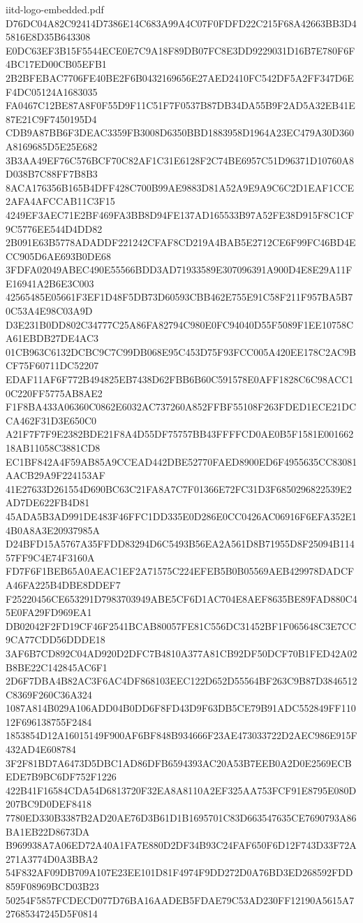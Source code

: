 \begin{filecontents*}[overwrite]{iitd-logo-embedded.pdf}
D76DC04A82C92414D7386E14C683A99A4C07F0FDFD22C215F68A42663BB3D45816E8D35B643308
E0DC63EF3B15F5544ECE0E7C9A18F89DB07FC8E3DD9229031D16B7E780F6F4BC17ED00CB05EFB1
2B2BFEBAC7706FE40BE2F6B0432169656E27AED2410FC542DF5A2FF347D6EF4DC05124A1683035
FA0467C12BE87A8F0F55D9F11C51F7F0537B87DB34DA55B9F2AD5A32EB41E87E21C9F7450195D4
CDB9A87BB6F3DEAC3359FB3008D6350BBD1883958D1964A23EC479A30D360A8169685D5E25E682
3B3AA49EF76C576BCF70C82AF1C31E6128F2C74BE6957C51D96371D10760A8D038B7C88FF7B8B3
8ACA176356B165B4DFF428C700B99AE9883D81A52A9E9A9C6C2D1EAF1CCE2AFA4AFCCAB11C3F15
4249EF3AEC71E2BF469FA3BB8D94FE137AD165533B97A52FE38D915F8C1CF9C5776EE544D4DD82
2B091E63B5778ADADDF221242CFAF8CD219A4BAB5E2712CE6F99FC46BD4ECC905D6AE693B0DE68
3FDFA02049ABEC490E55566BDD3AD71933589E307096391A900D4E8E29A11FE16941A2B6E3C003
42565485E05661F3EF1D48F5DB73D60593CBB462E755E91C58F211F957BA5B70C53A4E98C03A9D
D3E231B0DD802C34777C25A86FA82794C980E0FC94040D55F5089F1EE10758CA61EBDB27DE4AC3
01CB963C6132DCBC9C7C99DB068E95C453D75F93FCC005A420EE178C2AC9BCF75F60711DC52207
EDAF11AF6F772B494825EB7438D62FBB6B60C591578E0AFF1828C6C98ACC10C220FF5775AB8AE2
F1F8BA433A06360C0862E6032AC737260A852FFBF55108F263FDED1ECE21DCCA462F31D3E650C0
A21F7F7F9E2382BDE21F8A4D55DF75757BB43FFFFCD0AE0B5F1581E00166218AB11058C3881CD8
EC1BF842A4F59AB85A9CCEAD442DBE52770FAED8900ED6F4955635CC83081AACB29A9F224153AF
41E27633D261554D690BC63C21FA8A7C7F01366E72FC31D3F6850296822539E2AD7DE622FB4D81
45ADA5B3AD991DE483F46FFC1DD335E0D286E0CC0426AC06916F6EFA352E14B0A8A3E20937985A
D24BFD15A5767A35FFDD83294D6C5493B56EA2A561D8B71955D8F25094B11457FF9C4E74F3160A
FD7F6F1BEB65A0AEAC1EF2A71575C224EFEB5B0B05569AEB429978DADCFA46FA225B4DBE8DDEF7
F25220456CE653291D7983703949ABE5CF6D1AC704E8AEF8635BE89FAD880C45E0FA29FD969EA1
DB02042F2FD19CF46F2541BCAB80057FE81C556DC31452BF1F065648C3E7CC9CA77CDD56DDDE18
3AF6B7CD892C04AD920D2DFC7B4810A377A81CB92DF50DCF70B1FED42A02B8BE22C142845AC6F1
2D6F7DBA4B82AC3F6AC4DF868103EEC122D652D55564BF263C9B87D3846512C8369F260C36A324
1087A814B029A106ADD04B0DD6F8FD43D9F63DB5CE79B91ADC552849FF11012F696138755F2484
1853854D12A16015149F900AF6BF848B934666F23AE473033722D2AEC986E915F432AD4E608784
3F2F81BD7A6473D5DBC1AD86DFB6594393AC20A53B7EEB0A2D0E2569ECBEDE7B9BC6DF752F1226
422B41F16584CDA54D6813720F32EA8A8110A2EF325AA753FCF91E8795E080D207BC9D0DEF8418
7780ED330B3387B2AD20AE76D3B61D1B1695701C83D663547635CE7690793A86BA1EB22D8673DA
B969938A7A06ED72A40A1FA7E880D2DF34B93C24FAF650F6D12F743D33F72A271A3774D0A3BBA2
54F832AF09DB709A107E23EE101D81F4974F9DD272D0A76BD3ED268592FDD859F08969BCD03B23
50254F5857FCDECD077D76BA16AADEB5FDAE79C53AD230FF12190A5615A727685347245D5F0814

\end{filecontents*}
